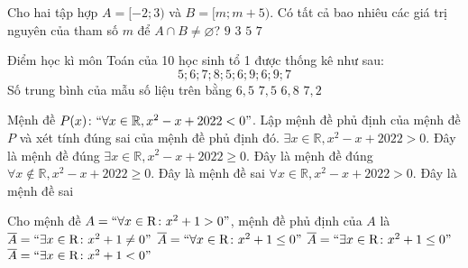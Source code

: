 \begin{ex}%
	Cho hai tập hợp $A=[-2 ; 3)$ và $B=[m ; m+5)$. Có tất cả bao nhiêu các giá trị nguyên của tham số $m$ để $A \cap B \neq \varnothing$?
	\choice
	{\True $ 9 $}
	{$ 3 $}
	{ $ 5 $}
	{$ 7 $}
\end{ex}
\begin{ex}%
	Điểm học kì môn Toán của 10 học sinh tổ 1 được thống kê như sau:
	$$
	5 ; 6 ; 7 ; 8 ; 5 ; 6 ; 9 ; 6 ; 9 ; 7
	$$
	Số trung bình của mẫu số liệu trên bằng
	\choice
	{$ 6{,}5 $}
	{$ 7{,}5 $}
	{\True $ 6{,}8 $}
	{$  7{,}2 $}
\end{ex}
\begin{ex}%
	 Mệnh đề $P(x)\colon\text{\lq \lq}\forall x \in \mathbb{R}, x^2-x+2022<0\text{\rq \rq}$. Lập mệnh đề phủ định của mệnh đề $P$ và xét tính đúng sai của mệnh đề phủ định đó.
	\choice
	{$\exists x \in \mathbb{R}, x^2-x+2022>0$. Đây là mệnh đề đúng}
	{\True $\exists x \in \mathbb{R}, x^2-x+2022 \geq 0$. Đây là mệnh đề đúng}
	{$\forall x \notin \mathbb{R}, x^2-x+2022 \geq 0$. Đây là mệnh đề sai}
	{$\forall x \in \mathbb{R}, x^2-x+2022>0$. Đây là mệnh đề sai}
\end{ex}
\begin{ex}%
	Cho mệnh đề $A=\text{\lq \lq}\forall x \in \mathrm{R}\colon x^2+1>0\text{\rq \rq}$, mệnh đề phủ định của $A$ là
	\choice
	{$\overline{A}=\text{\lq \lq}\exists x \in \mathrm{R}\colon x^2+1 \neq 0\text{\rq \rq}$}
	{$\overline{A}=\text{\lq \lq}\forall x \in \mathrm{R}\colon x^2+1 \leq 0\text{\rq \rq}$}
	{\True $\overline{A}=\text{\lq \lq}\exists x \in \mathrm{R}\colon x^2+1 \leq 0\text{\rq \rq}$}
	{$\overline{A}=\text{\lq \lq}\exists x \in \mathrm{R}\colon x^2+1<0\text{\rq \rq}$}
\end{ex}
